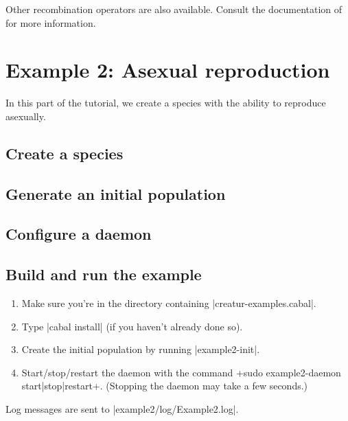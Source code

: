 \documentclass[a4paper,10pt]{report}
\begin{document}
Other recombination operators are also available.
Consult the documentation of 
for more information.

\chapter{Example 2: Asexual reproduction}
\label{sec:plant}

In this part of the tutorial, we create a species with the
ability to reproduce asexually.

\section{Create a species}
\label{sec:species2}



\section{Generate an initial population}
\label{sec:pop2}



\section{Configure a daemon}
\label{sec:daemon2}



\section{Build and run the example}
\label{sec:run2}

\begin{enumerate}
\item Make sure you're in the directory containing |creatur-examples.cabal|.
\item Type |cabal install| (if you haven't already done so).
\item Create the initial population by running |example2-init|.
\item Start/stop/restart the daemon with the command
\UndefineShortVerb{\|}
\DefineShortVerb{\+}
+sudo example2-daemon start|stop|restart+.
\UndefineShortVerb{\+}
\DefineShortVerb{\|}
(Stopping the daemon may take a few seconds.)
\end{enumerate}

Log messages are sent to |example2/log/Example2.log|.
\end{document}
